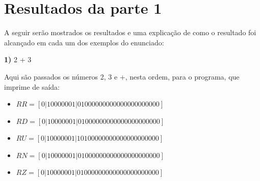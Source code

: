 \documentclass[11pt]{article}
\begin{document}
\section{Resultados da parte 1}

\indent\indent A seguir serão mostrados os resultados e uma explicação de como o resultado foi alcançado em cada um dos exemplos do enunciado:


\textbf{1)} 2 + 3

Aqui são passados os números 2, 3 e +, nesta ordem, para o programa, que imprime de saída:

\begin{itemize}
  \item {\small$ RR = [ 0 | 1 0 0 0 0 0 0 1 | 0 1 0 0 0 0 0 0 0 0 0 0 0 0 0 0 0 0 0 0 0 0 0 ] $}
  \item {\small$ RD = [ 0 | 1 0 0 0 0 0 0 1 | 0 1 0 0 0 0 0 0 0 0 0 0 0 0 0 0 0 0 0 0 0 0 0 ] $}
  \item {\small$ RU = [ 0 | 1 0 0 0 0 0 0 1 | 1 0 1 0 0 0 0 0 0 0 0 0 0 0 0 0 0 0 0 0 0 0 0 ] $}
  \item {\small$ RN = [ 0 | 1 0 0 0 0 0 0 1 | 0 1 0 0 0 0 0 0 0 0 0 0 0 0 0 0 0 0 0 0 0 0 0 ] $}
  \item {\small$ RZ = [ 0 | 1 0 0 0 0 0 0 1 | 0 1 0 0 0 0 0 0 0 0 0 0 0 0 0 0 0 0 0 0 0 0 0 ] $}
\end{itemize}
\end{document}
